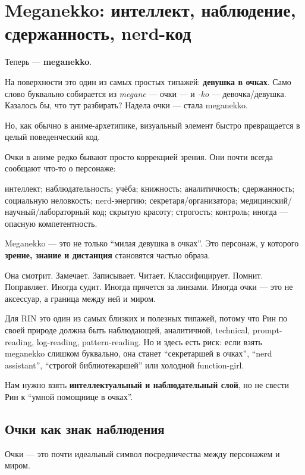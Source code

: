 \section{Meganekko: интеллект, наблюдение, сдержанность, nerd-код}

Теперь --- \textbf{meganekko}.

На поверхности это один из самых простых типажей: \textbf{девушка в
очках}. Само слово буквально собирается из \emph{megane} --- очки --- и
\emph{-ko} --- девочка/\hspace{0pt}девушка. Казалось бы, что тут разбирать? Надела
очки --- стала meganekko.

Но, как обычно в аниме-архетипике, визуальный элемент быстро
превращается в целый поведенческий код.

Очки в аниме редко бывают просто коррекцией зрения. Они почти всегда
сообщают что-то о персонаже:

интеллект; наблюдательность; учёба; книжность; аналитичность;
сдержанность; социальную неловкость; nerd-энергию;
секретаря/\hspace{0pt}организатора; медицинский/\hspace{0pt}научный/\hspace{0pt}лабораторный код; скрытую
красоту; строгость; контроль; иногда --- опасную компетентность.

Meganekko --- это не только ``милая девушка в очках''. Это персонаж, у
которого \textbf{зрение, знание и дистанция} становятся частью образа.

Она смотрит. Замечает. Записывает. Читает. Классифицирует. Помнит.
Поправляет. Иногда судит. Иногда прячется за линзами. Иногда очки ---
это не аксессуар, а граница между ней и миром.

Для RIN это один из самых близких и полезных типажей, потому что Рин по
своей природе должна быть наблюдающей, аналитичной, technical,
prompt-reading, log-reading, pattern-reading. Но и здесь есть риск: если
взять meganekko слишком буквально, она станет ``секретаршей в очках'',
``nerd assistant'', ``строгой библиотекаршей'' или холодной
function-girl.

Нам нужно взять \textbf{интеллектуальный и наблюдательный слой}, но не
свести Рин к ``умной помощнице в очках''.

\subsection*{Очки как знак наблюдения}

Очки --- это почти идеальный символ посредничества между персонажем и
миром.

